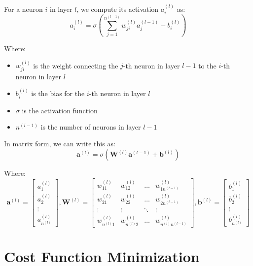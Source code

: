 For a neuron $i$ in layer $l$, we compute its activation $a_i^{(l)}$ as:
\begin{equation}
a_i^{(l)} = \sigma\left(\sum_{j=1}^{n^{(l-1)}} w_{ji}^{(l)} a_j^{(l-1)} + b_i^{(l)}\right)
\end{equation}

Where:
\begin{itemize}
    \item $w_{ji}^{(l)}$ is the weight connecting the $j$-th neuron in layer $l-1$ to the $i$-th neuron in layer $l$
    \item $b_i^{(l)}$ is the bias for the $i$-th neuron in layer $l$
    \item $\sigma$ is the activation function
    \item $n^{(l-1)}$ is the number of neurons in layer $l-1$
\end{itemize}

In matrix form, we can write this as:
\begin{equation}
\mathbf{a}^{(l)} = \sigma(\mathbf{W}^{(l)} \mathbf{a}^{(l-1)} + \mathbf{b}^{(l)})
\end{equation}

Where:
\begin{equation}
\mathbf{a}^{(l)} = 
\begin{bmatrix}
a_1^{(l)} \\
a_2^{(l)} \\
\vdots \\
a_{n^{(l)}}^{(l)}
\end{bmatrix},
\mathbf{W}^{(l)} = 
\begin{bmatrix}
w_{11}^{(l)} & w_{12}^{(l)} & \ldots & w_{1n^{(l-1)}}^{(l)} \\
w_{21}^{(l)} & w_{22}^{(l)} & \ldots & w_{2n^{(l-1)}}^{(l)} \\
\vdots & \vdots & \ddots & \vdots \\
w_{n^{(l)}1}^{(l)} & w_{n^{(l)}2}^{(l)} & \ldots & w_{n^{(l)}n^{(l-1)}}^{(l)}
\end{bmatrix},
\mathbf{b}^{(l)} = 
\begin{bmatrix}
b_1^{(l)} \\
b_2^{(l)} \\
\vdots \\
b_{n^{(l)}}^{(l)}
\end{bmatrix}
\end{equation}

\section{Cost Function Minimization}

